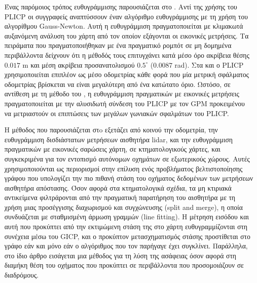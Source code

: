 Ένας παρόμοιος τρόπος ευθυγράμμισης παρουσιάζεται στο \cite{Peng2018a}. Αντί
της χρήσης του PLICP οι συγγραφείς αναπτύσσουν έναν αλγόριθμο ευθυγράμμισης με
τη χρήση του αλγορίθμου Gauss-Newton.  Αυτή η ευθυγράμμιση πραγματοποιείται με
κλιμακωτά αυξανόμενη ανάλυση του χάρτη από τον οποίον εξάγονται οι εικονικές
μετρήσεις.  Τα πειράματα που πραγματοποιήθηκαν με ένα πραγματικό ρομπότ σε μη
δομημένα περιβάλλοντα δείχνουν ότι η μέθοδός τους επιτυγχάνει κατά μέσο όρο
ακρίβεια θέσης $0.017$ m και μέση ακρίβεια προσανατολισμού $0.5^\circ$
($0.0087$ rad). Στα \cite{Chen2019a} και \cite{Liu2019a} ο PLICP
χρησιμοποιείται επιπλέον ως μέσο οδομετρίας κάθε φορά που μία μετρική σφάλματος
οδομετρίας βρίσκεται να είναι μεγαλύτερη από ένα κατώτατο όριο. Ωστόσο, σε
αντίθεση με τη μέθοδο του \cite{Peng2018a}, η ευθυγράμμιση πραγματικών με
εικονικές μετρήσεις πραγματοποιείται με την αλυσιδωτή σύνδεση του PLICP με τον
GPM \cite{Censib} προκειμένου να μετριαστούν οι επιπτώσεις των μεγάλων γωνιακών
σφαλμάτων του PLICP.

Η μέθοδος που παρουσιάζεται στo \cite{Bresson2019a} εξετάζει από κοινού την
οδομετρία, την ευθυγράμμιση δισδιάστατων μετρήσεων αισθητήρα lidar, και την
ευθυγράμμιση πραγματικών με εικονικές σαρώσεις χάρτη, σε κτηματολογικούς
χάρτες, και συγκεκριμένα για τον εντοπισμό αυτόνομων οχημάτων σε εξωτερικούς
χώρους. Αυτές χρησιμοποιούνται ως περιορισμοί στην επίλυση ενός προβλήματος
βελτιστοποίησης γράφου που υπολογίζει την πιο πιθανή στάση του οχήματος
δεδομένων των μετρήσεων αισθητήρα απόστασης. Όσον αφορά στα κτηματολογικά
σχέδια, τα μη κτιριακά αντικείμενα φιλτράρονται από την πραγματική παρατήρηση
του αισθητήρα με τη χρήση μιας προσέγγισης διαχωρισμού και συγχώνευσης (split
and merge), η οποία συνδυάζεται με σταθμισμένη άρμωση γραμμών (line fitting). Η
μέτρηση εισόδου και αυτή που προκύπτει από την εκτιμώμενη στάση της στο χάρτη
ευθυγραμμίζονται στη συνέχεια μέσω του GICP, και ο προκύπτον μετασχηματισμός
στάσης προστίθεται στο γράφο εάν και μόνο εάν ο αλγόριθμος που τον παρήγαγε
έχει συγκλίνει. Παράλληλα, στο ίδιο άρθρο εισάγεται μια μέθοδος για τη λύση της
ασάφειας όσον αφορά στη διαμήκη θέση του οχήματος που προκύπτει σε περιβάλλοντα
που προσομοιάζουν σε διαδρόμους.

